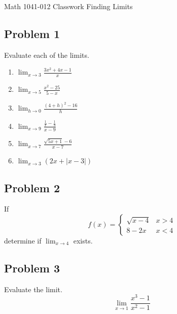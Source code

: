\documentclass[10pt]{book}
\theoremstyle{definition}
\begin{document}
\begin{center}
{\Large Math 1041-012 \hspace{0.5cm} Classwork Finding Limits}
\end{center}
\vspace{0.2 cm}
\subsection*{Problem 1}
Evaluate each of the limits.
\begin{enumerate}[label=(\alph*)]
    \item $\displaystyle \lim_{x\rightarrow 3}\frac{3x^2+4x-1}{x}$\vspace{2.5cm}
    \item $\displaystyle \lim_{x\rightarrow 5}\frac{x^2-25}{5-x}$ \vspace{2.5cm}
    \item $\displaystyle \lim_{h\rightarrow 0}\frac{(4+h)^2-16}{h}$\vspace{2.5cm}
    \item $\displaystyle \lim_{x\rightarrow 9}\frac{\frac{1}{x}-\frac{1}{9}}{x-9}$\vspace{2.5cm}
    \item $\displaystyle \lim_{x\rightarrow 7}\frac{\sqrt{5x+1}-6}{x-7}$\vspace{2.5cm}
    \item $\displaystyle\lim_{x\rightarrow 3}(2x+|x-3|)$
\end{enumerate}
\pagebreak
\subsection*{Problem 2}
If
\[
f(x)=\begin{cases}
\sqrt{x-4} & x>4\\
8-2x & x<4
\end{cases}
\]
determine if $\lim_{x\rightarrow 4}$ exists.
\vspace{5cm}
\subsection*{Problem 3}
Evaluate the limit.
\[
\lim_{x\rightarrow 1}\frac{x^3-1}{x^2-1}
\]
\end{document}
